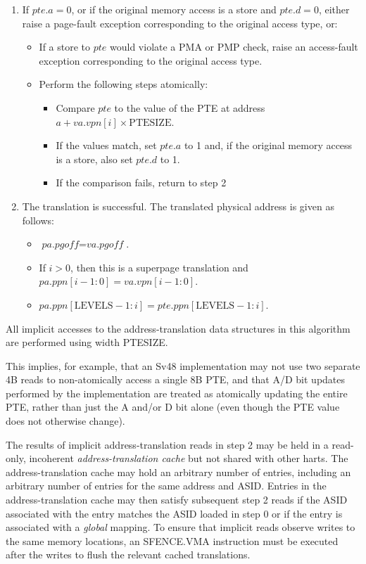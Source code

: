 \begin{enumerate}
\item If $pte.a=0$, or if the original memory access is a store and $pte.d=0$, either
  raise a page-fault exception corresponding to the original access type, or:
  \begin{itemize}
  \item If a store to $pte$ would violate a PMA or PMP check, raise an
    access-fault exception corresponding to the original access type.
  \item Perform the following steps atomically:
    \begin{itemize}
      \item Compare $pte$ to the value of the PTE at address $a+va.vpn[i]\times \textrm{PTESIZE}$.
      \item If the values match, set $pte.a$ to 1 and, if the original memory
        access is a store, also set $pte.d$ to 1.
      \item If the comparison fails, return to step 2
    \end{itemize}
  \end{itemize}

\item The translation is successful. The translated physical address is
  given as follows:
\begin{itemize}
\item $\textit{pa.pgoff} = \textit{va.pgoff}$.
\item If $i>0$, then this is a superpage translation and $pa.ppn[i-1:0]=va.vpn[i-1:0]$.
\item $pa.ppn[\textrm{LEVELS} - 1:i] = pte.ppn[\textrm{LEVELS} - 1:i]$.
\end{itemize}

\end{enumerate}

All implicit accesses to the address-translation data structures in this
algorithm are performed using width PTESIZE.

\begin{commentary}
This implies, for example, that an Sv48 implementation may not use two separate
4B reads to non-atomically access a single 8B PTE, and that A/D bit updates
performed by the implementation are treated as atomically updating the entire
PTE, rather than just the A and/or D bit alone (even though the PTE value does
not otherwise change).
\end{commentary}

The results of implicit address-translation reads in step 2 may be held in a
read-only, incoherent {\em address-translation cache} but not shared with other
harts.  The address-translation cache may hold an arbitrary number of entries,
including an arbitrary number of entries for the same address and ASID.
Entries in the address-translation cache may then satisfy subsequent step 2
reads if the ASID associated with the entry matches the ASID loaded in step 0
or if the entry is associated with a {\em global} mapping.  To ensure that
implicit reads observe writes to the same memory locations, an SFENCE.VMA
instruction must be executed after the writes to flush the relevant cached
translations.

